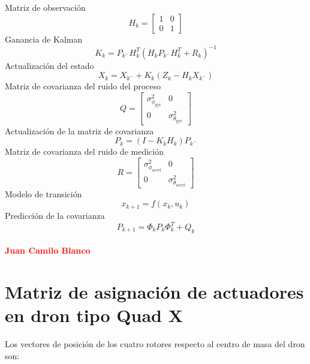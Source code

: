 \documentclass[11pt,a4paper]{article}
\begin{document}
 Matriz de observación
\begin{equation}
H_k
=
\begin{bmatrix}
1 & 0 \\
0 & 1
\end{bmatrix}
\end{equation}
Ganancia de Kalman
\begin{equation}
K_k
=
P_{k^-}H_k^T
\left(
H_kP_{k^-}H_k^T+R_k
\right)^{-1}
\end{equation}
Actualización del estado
\begin{equation}
X_k
=
X_{k^-}
+
K_k
\left(
Z_k-H_kX_{k^-}
\right)
\end{equation}
 Matriz de covarianza del ruido del proceso
\begin{equation}
Q
=
\begin{bmatrix}
\sigma_{\phi_{\mathrm{gyr}}}^{2} & 0 \\
0 & \sigma_{\theta_{\mathrm{gyr}}}^{2}
\end{bmatrix}
\end{equation}
 Actualización de la matriz de covarianza
\begin{equation}
P_k
=
\left(
I-K_kH_k
\right)P_{k^-}
\end{equation}
 Matriz de covarianza del ruido de medición
\begin{equation}
R
=
\begin{bmatrix}
\sigma_{\phi_{\mathrm{accel}}}^{2} & 0 \\
0 & \sigma_{\theta_{\mathrm{accel}}}^{2}
\end{bmatrix}
\end{equation}
 Modelo de transición
\begin{equation}
x_{k+1}
=
f(x_k,u_k)
\end{equation}
 Predicción de la covarianza
\begin{equation}
P_{k+1}
=
\Phi_kP_k\Phi_k^T
+
Q_k
\end{equation}

\paragraph{\textcolor{red} {Juan Camilo Blanco}}

\section{Matriz de asignación de actuadores en dron tipo Quad X}

Los vectores de posición de los cuatro rotores respecto al centro de masa del dron son:
\end{document}

